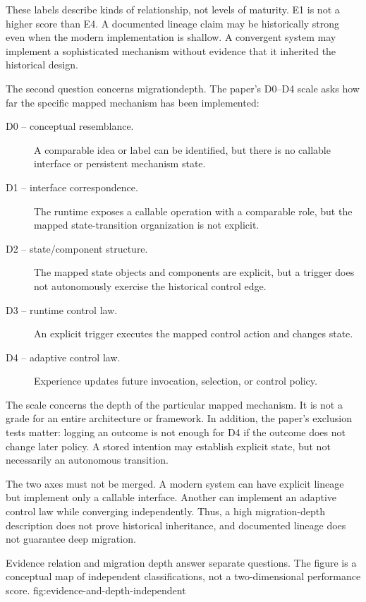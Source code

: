 These labels describe kinds of relationship, not levels of maturity. E1 is not a higher score than E4. A documented lineage claim may be historically strong even when the modern implementation is shallow. A convergent system may implement a sophisticated mechanism without evidence that it inherited the historical design.

The second question concerns \gls{migrationdepth}. The paper's D0--D4 scale asks how far the specific mapped mechanism has been implemented:
\begin{description}
  \item[D0 -- conceptual resemblance.] A comparable idea or label can be identified, but there is no callable interface or persistent mechanism state.
  \item[D1 -- interface correspondence.] The runtime exposes a callable operation with a comparable role, but the mapped state-transition organization is not explicit.
  \item[D2 -- state/component structure.] The mapped state objects and components are explicit, but a trigger does not autonomously exercise the historical control edge.
  \item[D3 -- runtime control law.] An explicit trigger executes the mapped control action and changes state.
  \item[D4 -- adaptive control law.] Experience updates future invocation, selection, or control policy.
\end{description}

The scale concerns the depth of the particular mapped mechanism. It is not a grade for an entire architecture or framework. In addition, the paper's exclusion tests matter: logging an outcome is not enough for D4 if the outcome does not change later policy. A stored intention may establish explicit state, but not necessarily an autonomous transition.

The two axes must not be merged. A modern system can have explicit lineage but implement only a callable interface. Another can implement an adaptive control law while converging independently. Thus, a high migration-depth description does not prove historical inheritance, and documented lineage does not guarantee deep migration.

  {Evidence relation and migration depth answer separate questions. The figure is a conceptual map of independent classifications, not a two-dimensional performance score.}
  {fig:evidence-and-depth-independent}

